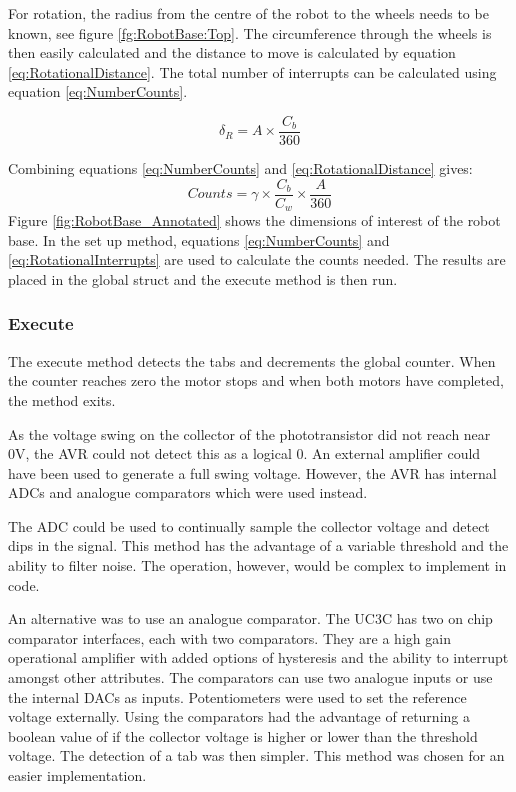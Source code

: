 For rotation, the radius from the centre of the robot to the wheels needs to be known, see figure \ref{fg:RobotBase:Top}. The circumference through the wheels is then easily calculated and the distance to move is calculated by equation \eqref{eq:RotationalDistance}. The total number of interrupts can be calculated using equation \eqref{eq:NumberCounts}. 

\begin{equation}
\label{eq:RotationalDistance}
\delta_{R} = A \times \frac{C_b}{360}
\end{equation}

Combining equations \eqref{eq:NumberCounts} and \eqref{eq:RotationalDistance} gives:
\begin{equation}
\label{eq:RotationalInterrupts}
Counts = \gamma \times \frac{C_b}{C_w} \times \frac{A}{360}
\end{equation}
Figure \ref{fig:RobotBase_Annotated} shows the dimensions of interest of the robot base. In the set up method, equations \eqref{eq:NumberCounts} and \eqref{eq:RotationalInterrupts} are used to calculate the counts needed. The results are placed in the global struct and the execute method is then run.

\subsubsection{Execute}

The execute method detects the tabs and decrements the global counter. When the counter reaches zero the motor stops and when both motors have completed, the method exits.

As the voltage swing on the collector of the phototransistor did not reach near 0V, the AVR could not detect this as a logical 0. An external amplifier could have been used to generate a full swing voltage. However, the AVR has internal ADCs and analogue comparators which were used instead. 

The ADC could be used to continually sample the collector voltage and detect dips in the signal. This method has the advantage of a variable threshold and the ability to filter noise. The operation, however, would be complex to implement in code. 

An alternative was to use an analogue comparator. The UC3C has two on chip comparator interfaces, each with two comparators. They are a high gain operational amplifier with added options of hysteresis and the ability to interrupt amongst other attributes. The comparators can use two analogue inputs or use the internal DACs as inputs. Potentiometers were used to set the reference voltage externally. Using the comparators had the advantage of returning a boolean value of if the collector voltage is higher or lower than the threshold voltage. The detection of a tab was then simpler. This method was chosen for an easier implementation.

